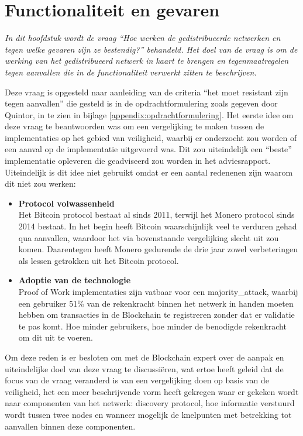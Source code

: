 \section{Functionaliteit en gevaren}

\textit{In dit hoofdstuk wordt de vraag ``Hoe werken de gedistribueerde netwerken en tegen welke gevaren zijn ze bestendig?'' behandeld. Het doel van de vraag is om de werking van het gedistribueerd netwerk in kaart te brengen en tegenmaatregelen tegen aanvallen die in de functionaliteit verwerkt zitten te beschrijven.}

Deze vraag is opgesteld naar aanleiding van de criteria ``het moet resistant zijn tegen aanvallen'' die gesteld is in de opdrachtformulering zoals gegeven door Quintor, in te zien in bijlage \ref{appendix:opdrachtformulering}. Het eerste idee om deze vraag te beantwoorden was om een vergelijking te maken tussen de implementaties op het gebied van veiligheid, waarbij er onderzocht zou worden of een aanval op de implementatie uitgevoerd was. Dit zou uiteindelijk een ``beste'' implementatie opleveren die geadviseerd zou worden in het adviesrapport. Uiteindelijk is dit idee niet gebruikt omdat er een aantal redenenen zijn waarom dit niet zou werken:

\begin{itemize}
  \item \textbf{Protocol volwassenheid}
  \\ Het Bitcoin protocol bestaat al sinds 2011, terwijl het Monero protocol sinds 2014 bestaat. In het begin heeft Bitcoin waarschijnlijk veel te verduren gehad qua aanvallen, waardoor het via bovenstaande vergelijking slecht uit zou komen. Daarentegen heeft Monero gedurende de drie jaar zowel verbeteringen als lessen getrokken uit het Bitcoin protocol.

  \item \textbf{Adoptie van de technologie}
  \\ Proof of Work implementaties zijn vatbaar voor een \gls{majority_attack}, waarbij een gebruiker 51\% van de rekenkracht binnen het netwerk in handen moeten hebben om transacties in de Blockchain te registreren zonder dat er validatie te pas komt. Hoe minder gebruikers, hoe minder de benodigde rekenkracht om dit uit te voeren.
\end{itemize}

Om deze reden is er besloten om met de Blockchain expert over de aanpak en uiteindelijke doel van deze vraag te discussiëren, wat ertoe heeft geleid dat de focus van de vraag veranderd is van een vergelijking doen op basis van de veiligheid, het een meer beschrijvende vorm heeft gekregen waar er gekeken wordt naar componenten van het netwerk: discovery protocol, hoe informatie verstuurd wordt tussen twee \glspl{node} en wanneer mogelijk de knelpunten met betrekking tot aanvallen binnen deze componenten.

